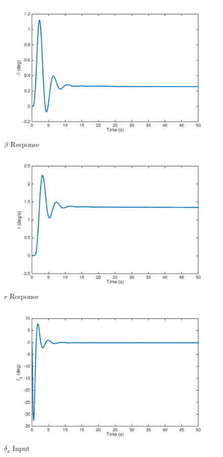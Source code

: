 \documentclass[12pt]{article}
\begin{document}
\clearpage
\begin{figure}[h!]
\begin{center}
\includegraphics[height=.4\textheight]{figures/beta}
\caption{$\beta$ Response}
\end{center}
\end{figure}

\begin{figure}[h!]
\begin{center}
\includegraphics[height=.4\textheight]{figures/r}
\caption{$r$ Response}
\end{center}
\end{figure}

\clearpage
\begin{figure}[h!]
\begin{center}
\includegraphics[height=.4\textheight]{figures/delta_a}
\caption{$\delta_a$ Input}
\end{center}
\end{figure}
\end{document}
